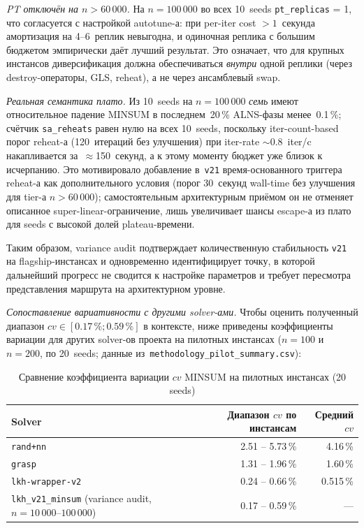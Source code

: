 \documentclass[14pt,a4paper]{extarticle}
\begin{document}
\textit{PT отключён на $n > 60\,000$.} На $n=100\,000$ во всех 10~seeds \texttt{pt\_replicas} = 1, что согласуется с настройкой autotune-а: при per-iter cost $> 1$~секунда амортизация на 4--6~реплик невыгодна, и одиночная реплика с большим бюджетом эмпирически даёт лучший результат. Это означает, что для крупных инстансов диверсификация должна обеспечиваться \emph{внутри} одной реплики (через destroy-операторы, GLS, reheat), а не через ансамблевый swap.

\textit{Реальная семантика плато.} Из 10~seeds на $n=100\,000$ \emph{семь} имеют относительное падение MINSUM в последнем~20\,\% ALNS-фазы менее~0.1\,\%; счётчик \texttt{sa\_reheats} равен нулю на всех 10~seeds, поскольку iter-count-based порог reheat-а (120~итераций без улучшения) при iter-rate $\sim$0.8~iter/c накапливается за~$\approx$150~секунд, а к этому моменту бюджет уже близок к исчерпанию. Это мотивировало добавление в~\texttt{v21} время-основанного триггера reheat-а как дополнительного условия (порог 30~секунд wall-time без улучшения для tier-а $n > 60\,000$); самостоятельным архитектурным приёмом он не отменяет описанное super-linear-ограничение, лишь увеличивает шансы escape-а из плато для seeds с высокой долей plateau-времени.

Таким образом, variance audit подтверждает количественную стабильность \texttt{v21} на flagship-инстансах и одновременно идентифицирует точку, в которой дальнейший прогресс не сводится к настройке параметров и требует пересмотра представления маршрута на архитектурном уровне.

\textit{Сопоставление вариативности с другими solver-ами.} Чтобы оценить полученный диапазон $cv \in [0.17\,\%; 0.59\,\%]$ в контексте, ниже приведены коэффициенты вариации для других solver-ов проекта на пилотных инстансах ($n=100$ и $n=200$, по 20~seeds; данные из~\texttt{methodology\_pilot\_summary.csv}):

\begin{table}[H]
\centering
\caption{Сравнение коэффициента вариации $cv$ MINSUM на пилотных инстансах (20 seeds)}
\small
\begin{tabular}{lrr}
\toprule
Solver & Диапазон $cv$ по инстансам & Средний $cv$\\
\midrule
\texttt{rand+nn}        & 2.51 -- 5.73\,\% & 4.16\,\%\\
\texttt{grasp}          & 1.31 -- 1.96\,\% & 1.60\,\%\\
\texttt{lkh-wrapper-v2} & 0.24 -- 0.66\,\% & 0.515\,\%\\
\midrule
\texttt{lkh\_v21\_minsum} (variance audit, $n=10\,000$--$100\,000$) & 0.17 -- 0.59\,\% & ---\\
\bottomrule
\end{tabular}
\normalsize
\end{table}
\end{document}
